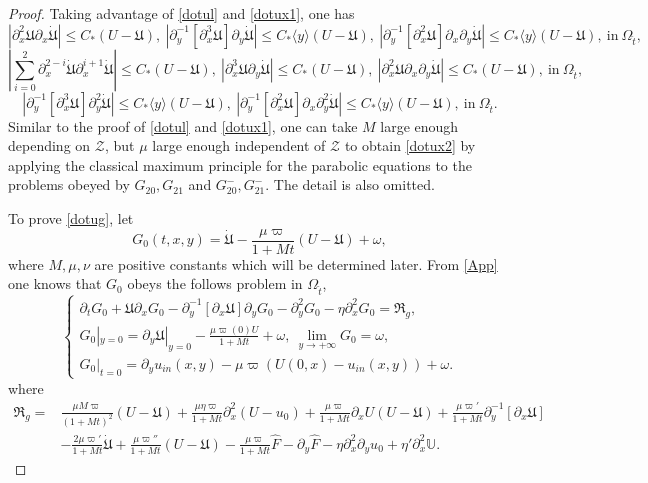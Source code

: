 \documentclass{amsart}
\numberwithin{equation}{section}
\newcommand\y{{{\langle y \rangle}}}
\begin{document}
\begin{proof}
Taking advantage of \eqref{dotul} and \eqref{dotux1}, one has
$$|\partial_{x}^{2}\mathfrak{U}\partial_{x}\dot{\mathfrak{U}}|\leq C_{*}(U-\mathfrak{U}),~
  |\partial_{y}^{-1}[\partial_{x}^{3}\mathfrak{U}]\partial_{y}\dot{\mathfrak{U}}|\leq C_{*}\y(U-\mathfrak{U}),~
  |\partial_{y}^{-1}[\partial_{x}^{2}\mathfrak{U}]\partial_{x}\partial_{y}\dot{\mathfrak{U}}|\leq C_{*}\y(U-\mathfrak{U}),
  ~\text{in}~\Omega_{\hat{t}},$$
$$\left|\sum_{i=0}^{2}\partial_{x}^{2-i}\dot{\mathfrak{U}}\partial_{x}^{i+1}\dot{\mathfrak{U}}\right|\leq C_{*}(U-\mathfrak{U}),~
  |\partial_{x}^{3}\mathfrak{U}\partial_{y}\dot{\mathfrak{U}}|\leq C_{*}(U-\mathfrak{U}),~
  |\partial_{x}^{2}\mathfrak{U}\partial_{x}\partial_{y}\dot{\mathfrak{U}}|\leq C_{*}(U-\mathfrak{U}),~\text{in}~\Omega_{\hat{t}},$$
$$|\partial_{y}^{-1}[\partial_{x}^{3}\mathfrak{U}]\partial_{y}^{2}\dot{\mathfrak{U}}|\leq C_{*}\y(U-\mathfrak{U}),~
  |\partial_{y}^{-1}[\partial_{x}^{2}\mathfrak{U}]\partial_{x}\partial_{y}^{2}\dot{\mathfrak{U}}|\leq C_{*}\y(U-\mathfrak{U}),
  ~\text{in}~\Omega_{\hat{t}}.$$
Similar to the proof of \eqref{dotul} and \eqref{dotux1}, one can take $M$ large enough depending on $\mathcal{Z}$, but $\mu$ large enough independent of $\mathcal{Z}$ to obtain \eqref{dotux2} by applying the classical maximum principle for the parabolic equations to the problems obeyed by $G_{20},G_{21}$ and $G_{20}^{-},G_{21}^{-}$. The detail is also omitted.

To prove \eqref{dotug}, let
$$G_{0}(t,x,y)=\dot{\mathfrak{U}}-\frac{\mu\varpi}{1+Mt}(U-\mathfrak{U})+\omega,$$
where $M,\mu,\nu$ are positive constants which will be determined later.
From \eqref{App} one knows that $G_{0}$ obeys the follows problem in $\Omega_{\hat{t}}$,
\begin{equation}\label{G0}
\begin{cases}
\partial_{t}G_{0}
+\mathfrak{U}\partial_{x}G_{0}
-\partial_{y}^{-1}[\partial_{x}\mathfrak{U}]\partial_{y}G_{0}
-\partial_{y}^{2}G_{0}
-\eta\partial_{x}^{2}G_{0}
=\mathfrak{R}_{g},\\
G_{0}|_{y=0}=\partial_{y}\mathfrak{U}|_{y=0}-\frac{\mu\varpi(0)U}{1+Mt}+\omega,~
\lim\limits_{y\to+\infty}G_{0}=\omega,\\
G_{0}|_{t=0}=\partial_{y}u_{in}(x,y)-\mu\varpi(U(0,x)-u_{in}(x,y))+\omega.
\end{cases}
\end{equation}
where
\begin{align*}
\mathfrak{R}_{g}
=& \frac{\mu M\varpi}{(1+Mt)^{2}}(U-\mathfrak{U})
  +\frac{\mu\eta\varpi}{1+Mt}\partial_{x}^{2}(U-u_{0})
  +\frac{\mu\varpi}{1+Mt}\partial_{x}U(U-\mathfrak{U})
  +\frac{\mu\varpi'}{1+Mt}\partial_{y}^{-1}[\partial_{x}\mathfrak{U}]\\
 &-\frac{2\mu\varpi'}{1+Mt}\dot{\mathfrak{U}}
  +\frac{\mu\varpi''}{1+Mt}(U-\mathfrak{U})
  -\frac{\mu\varpi}{1+Mt}\hat{F}
  -\partial_{y}\hat{F}
  -\eta\partial_{x}^{2}\partial_{y}u_{0}
  +\eta'\partial_{x}^{2}\mathbb{U}.
\end{align*}


\end{proof}
\end{document}
